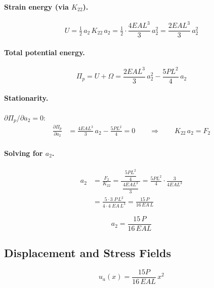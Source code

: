 \documentclass[11pt, a4paper]{article}
\begin{document}
\paragraph{Strain energy (via $K_{22}$).}
\begin{equation}
U = \tfrac{1}{2}\,a_2\,K_{22}\,a_2 = \tfrac{1}{2}\cdot\frac{4EAL^3}{3}\,a_2^2 = \frac{2EAL^3}{3}\,a_2^2
\end{equation}

\paragraph{Total potential energy.}
\begin{equation}\label{eq:pi_a}
\Pi_p = U + \Omega = \frac{2EAL^3}{3}\,a_2^2 - \frac{5PL^2}{4}\,a_2
\end{equation}

\paragraph{Stationarity.}
$\partial\Pi_p/\partial a_2=0$:
\begin{align*}
\frac{\partial\Pi_p}{\partial a_2}
&= \frac{4EAL^3}{3}\,a_2 - \frac{5PL^2}{4} = 0
\qquad\Longrightarrow\qquad K_{22}\,a_2 = F_2
\end{align*}

\paragraph{Solving for $a_2$.}
\begin{align*}
a_2 &= \frac{F_2}{K_{22}}
     = \frac{\;\dfrac{5PL^2}{4}\;}{\;\dfrac{4EAL^3}{3}\;}
     = \frac{5PL^2}{4}\cdot\frac{3}{4EAL^3} \\[8pt]
    &= \frac{5\cdot 3\;P\,L^2}{4\cdot 4\;EA\,L^3}
     = \frac{15\,P}{16\,EA\,L}
\end{align*}

\begin{equation}\label{eq:a2_parta}
\boxed{a_2 = \frac{15\,P}{16\,EAL}}
\end{equation}

\subsection{Displacement and Stress Fields}

\begin{equation}\label{eq:u_a}
\boxed{u_a(x) = \frac{15P}{16\,EAL}\,x^2}
\end{equation}
\end{document}
